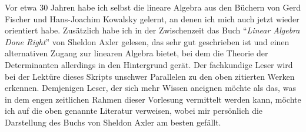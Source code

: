 Vor etwa 30 Jahren habe ich selbst die lineare Algebra aus den B\"{u}chern von Gerd Fischer
\cite{fischer:2008} und Hans-Joachim Kowalsky \cite{kowalsky:2003} gelernt, an denen ich mich auch
jetzt wieder orientiert habe.  Zus\"{a}tzlich habe ich in der Zwischenzeit das Buch 
``\emph{Linear Algebra Done Right}'' von Sheldon Axler \cite{axler:1997} gelesen, das sehr gut geschrieben ist
und einen alternativen Zugang zur linearen Algebra bietet, bei dem die Theorie der Determinanten
allerdings in den Hintergrund ger\"{a}t.  Der fachkundige Leser wird bei der Lekt\"{u}re dieses Skripts
unschwer Parallelen zu den oben zitierten Werken erkennen.   Demjenigen Leser, der sich mehr Wissen
aneignen m\"{o}chte als das, was in dem engen zeitlichen Rahmen dieser Vorlesung vermittelt werden kann,
m\"{o}chte ich auf die oben genannte Literatur verweisen, wobei mir pers\"{o}nlich die Darstellung des Buchs
von Sheldon Axler am besten gef\"{a}llt. 


